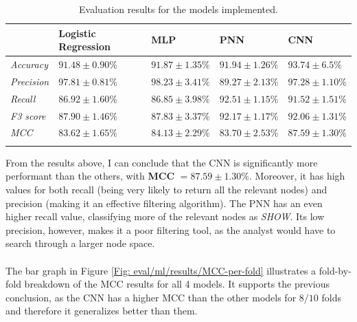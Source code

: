 		\begin{longtable}{|p{}|p{}|p{}|p{}|p{}|}
			\hline
			& \textbf{Logistic Regression} & \textbf{MLP} & \textbf{PNN} &  \textbf{CNN}\\
			\hline
			\textit{Accuracy} & $91.48 \pm 0.90 \%$ &$91.87 \pm 1.35 \%$  &  $91.94 \pm 1.26 \%$ &\cellcolor{green!50}  $\mathbf{93.74 \pm 6.5 \%}$ \\
			\hline
			\textit{Precision} & $97.81 \pm 0.81\%$& $98.23 \pm 3.41 \%$ &   $89.27 \pm 2.13 \%$ & \cellcolor{green!50} $\mathbf{97.28 \pm 1.10 \%}$  \\
			\hline
			\textit{Recall} & $86.92 \pm 1.60\%$& $86.85 \pm 3.98 \%$ & $92.51 \pm 1.15 \%$ & \cellcolor{green!50} $\mathbf{91.52 \pm 1.51 \%}$  \\
			\hline
			\textit{F3 score} & $87.90 \pm 1.46 \%$ & $87.83 \pm 3.37 \%$  &  $92.17 \pm 1.17 \%$ & \cellcolor{green!50} $\mathbf{92.06 \pm 1.31 \%}$\\
			\hline
			\textit{MCC} & $83.62 \pm 1.65\%$& $84.13 \pm 2.29 \%$ &  $83.70 \pm 2.53 \%$ & \cellcolor{green!50} $\mathbf{87.59 \pm 1.30 \%}$\\
			\hline
			\caption{Evaluation results for the models implemented.}
			\label{Table: eval/models/results/overall}
		\end{longtable}
		From the results above, I can conclude that the CNN is significantly more performant than the others, with \textbf{MCC} $\mathbf{ = 87.59 \pm 1.30 \%}$. Moreover, it has high values for both recall (being very likely to return all the relevant nodes) and precision (making it an effective filtering algorithm). The PNN has an even higher recall value, classifying more of the relevant nodes as \textit{SHOW}. Its low precision, however, makes it a poor filtering tool, as the analyst would have to search through a larger node space.
		\\ \\
		The bar graph in Figure \ref{Fig: eval/ml/results/MCC-per-fold} illustrates a fold-by-fold breakdown of the MCC results for all 4 models. It supports the previous conclusion, as the CNN has a higher MCC than the other models for $8/10$ folds and therefore it generalizes better than them.    
